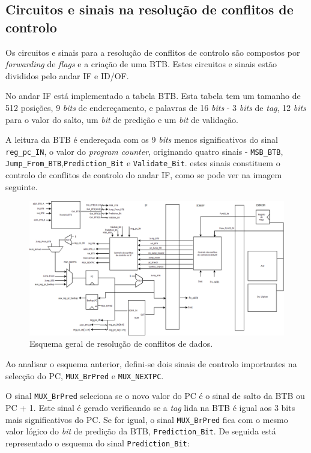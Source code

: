 \documentclass[11pt]{article}
\numberwithin{equation}{section}
\begin{document}
\subsection{Circuitos e sinais na resolução de conflitos de controlo}

Os circuitos e sinais para a resolução de conflitos de controlo são compostos por \textit{forwarding} de \textit{flags} e a criação de uma BTB. Estes circuitos e sinais estão divididos pelo andar IF e ID/OF.

No andar IF está implementado a tabela BTB. Esta tabela tem um tamanho de 512 posições, 9 \textit{bits} de endereçamento, e palavras de 16 \textit{bits} - 3 \textit{bits} de \textit{tag}, 12 \textit{bits} para o valor do salto, um \textit{bit} de predição e um \textit{bit} de validação.

A leitura da BTB é endereçada com os 9 \textit{bits} menos significativos do sinal \texttt{reg\_pc\_IN}, o valor do \textit{program counter}, originando quatro sinais - \texttt{MSB\_BTB}, \texttt{Jump\_From\_BTB},\texttt{Prediction\_Bit} e \texttt{Validate\_Bit}. estes sinais constituem o controlo de conflitos de controlo do andar IF, como se pode ver na imagem seguinte.

\begin{figure}[H]
	\centering
	\includegraphics[keepaspectratio=true, scale=0.27]{imagens/ConflitodeContrologeral}
	\vspace{-0.5em}
	\caption{Esquema geral de resolução de conflitos de dados.}
	\vspace{-0.8em}
\end{figure}

Ao analisar o esquema anterior, defini-se dois sinais de controlo importantes na selecção do PC, \texttt{MUX\_BrPred} e \texttt{MUX\_NEXTPC}. 

O sinal \texttt{MUX\_BrPred} seleciona se o novo valor do PC é o sinal de salto da BTB ou PC + 1. Este sinal é gerado verificando se a \textit{tag} lida na BTB é igual aos 3 bits mais significativos do PC. Se for igual, o sinal \texttt{MUX\_BrPred} fica com o mesmo valor lógico do \textit{bit} de predição da BTB, \texttt{Prediction\_Bit}. De seguida está representado o esquema do sinal \texttt{Prediction\_Bit}:
\end{document}
